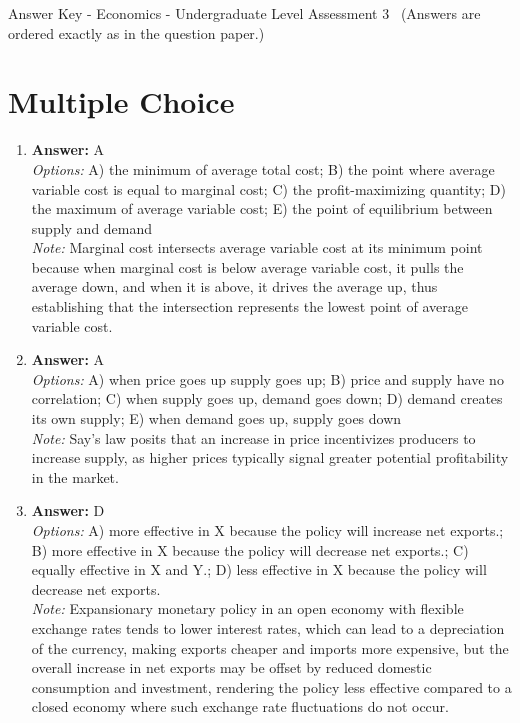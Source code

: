\documentclass[12pt]{article}
\begin{document}
\begin{center}
Answer Key - Economics - Undergraduate Level Assessment 3 \
\small (Answers are ordered exactly as in the question paper.)
\end{center}

\section*{Multiple Choice}
\begin{enumerate}[label=\arabic*.]
\item \textbf{Answer:} A
\\ \textit{Options:} A) the minimum of average total cost; B) the point where average variable cost is equal to marginal cost; C) the profit-maximizing quantity; D) the maximum of average variable cost; E) the point of equilibrium between supply and demand
\\ \textit{Note:} Marginal cost intersects average variable cost at its minimum point because when marginal cost is below average variable cost, it pulls the average down, and when it is above, it drives the average up, thus establishing that the intersection represents the lowest point of average variable cost.
\item \textbf{Answer:} A
\\ \textit{Options:} A) when price goes up supply goes up; B) price and supply have no correlation; C) when supply goes up, demand goes down; D) demand creates its own supply; E) when demand goes up, supply goes down
\\ \textit{Note:} Say's law posits that an increase in price incentivizes producers to increase supply, as higher prices typically signal greater potential profitability in the market.
\item \textbf{Answer:} D
\\ \textit{Options:} A) more effective in X because the policy will increase net exports.; B) more effective in X because the policy will decrease net exports.; C) equally effective in X and Y.; D) less effective in X because the policy will decrease net exports.
\\ \textit{Note:} Expansionary monetary policy in an open economy with flexible exchange rates tends to lower interest rates, which can lead to a depreciation of the currency, making exports cheaper and imports more expensive, but the overall increase in net exports may be offset by reduced domestic consumption and investment, rendering the policy less effective compared to a closed economy where such exchange rate fluctuations do not occur.

\end{enumerate}
\end{document}
